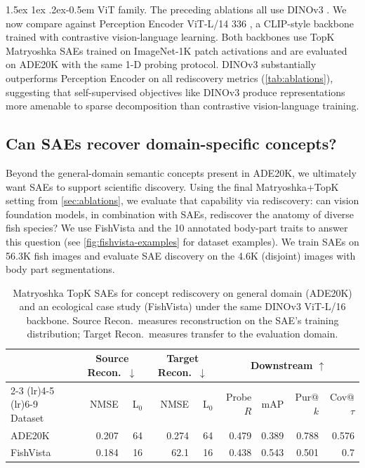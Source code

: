 \documentclass[runningheads]{llncs}
\makeatletter
\renewcommand{\paragraph}{%
  \@startsection{paragraph}{4}%
  {\z@}{1.5ex \@plus 1ex \@minus .2ex}{-0.5em}%
  {\normalfont\normalsize\bfseries}%
}
\makeatother
\begin{document}
\paragraph{ViT family.}\label{sec:backbone}
The preceding ablations all use DINOv3 \citep{simeoni2025dinov3}.
We now compare against Perception Encoder ViT-L/14 336 \citep{bolya2025perception}, a CLIP-style backbone trained with contrastive vision-language learning.
Both backbones use TopK Matryoshka SAEs trained on ImageNet-1K patch activations and are evaluated on ADE20K with the same 1-D probing protocol.
DINOv3 substantially outperforms Perception Encoder on all rediscovery metrics (\cref{tab:ablations}), suggesting that self-supervised objectives like DINOv3 produce representations more amenable to sparse decomposition than contrastive vision-language training.

\subsection{Can SAEs recover domain-specific concepts?}
\label{sec:fishvista}

Beyond the general-domain semantic concepts present in ADE20K, we ultimately want SAEs to support scientific discovery.
Using the final Matryoshka+TopK setting from \cref{sec:ablations}, we evaluate that capability via rediscovery: can vision foundation models, in combination with SAEs, rediscover the anatomy of diverse fish species? 
We use FishVista \citep{mehrab2024fishvista,fishvistadataset} and the 10 annotated body-part traits to answer this question (see \cref{fig:fishvista-examples} for dataset examples).
We train SAEs on \num{56.3}K fish images and evaluate SAE discovery on the \num{4.6}K (disjoint) images with body part segmentations.


\begin{table}[t]
    \centering
    \small
    \setlength{\tabcolsep}{3pt}
    \caption{Matryoshka TopK SAEs for concept rediscovery on general domain (ADE20K) and an ecological case study (FishVista) under the same DINOv3 ViT-L/16 backbone.
    Source Recon.\ measures reconstruction on the SAE's training distribution; Target Recon.\ measures transfer to the evaluation domain.}
    \label{tab:fishvista}
    \begin{tabular}{l rr rr rrrr}
    \toprule
    & \multicolumn{2}{c}{Source Recon.\ $\downarrow$} & \multicolumn{2}{c}{Target Recon.\ $\downarrow$} & \multicolumn{4}{c}{Downstream $\uparrow$} \\
    \cmidrule(lr){2-3} \cmidrule(lr){4-5} \cmidrule(lr){6-9}
    Dataset & NMSE & L$_0$ & NMSE & L$_0$ & Probe $R$ & mAP & Pur@$k$ & Cov@$\tau$ \\
    \midrule
    ADE20K & 0.207 & 64 & 0.274 & 64 & {0.479} & {0.389} & 0.788 & {0.576} \\  %
    FishVista & 0.184 & 16 & 62.1 & 16 & 0.438 & 0.543 & 0.501 & 0.7 \\ %
    \bottomrule
    \end{tabular}
\end{table}
\end{document}
